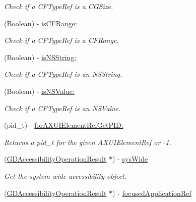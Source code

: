 \begin{DoxyCompactItemize}
\begin{DoxyCompactList}\small\item\em Check if a CFTypeRef is a CGSize. \item\end{DoxyCompactList}\item 
(Boolean) -\/ \hyperlink{interface_g_d_accessibility_manager_ac7682be7c9d421b3b6aff5bd0427c484}{isCFRange:}
\begin{DoxyCompactList}\small\item\em Check if a CFTypeRef is a CFRange. \item\end{DoxyCompactList}\item 
(Boolean) -\/ \hyperlink{interface_g_d_accessibility_manager_a7383e6153121e98d5c0a7b1a01705f50}{isNSString:}
\begin{DoxyCompactList}\small\item\em Check if a CFTypeRef is an NSString. \item\end{DoxyCompactList}\item 
(Boolean) -\/ \hyperlink{interface_g_d_accessibility_manager_acdce820e06d533b51a1eaec8618019c1}{isNSValue:}
\begin{DoxyCompactList}\small\item\em Check if a CFTypeRef is an NSValue. \item\end{DoxyCompactList}\item 
(pid\_\-t) -\/ \hyperlink{interface_g_d_accessibility_manager_a77c4e5a6c3c879ba3a1a4d305c2ebd31}{forAXUIElementRefGetPID:}
\begin{DoxyCompactList}\small\item\em Returns a pid\_\-t for the given AXUIElementRef or -\/1. \item\end{DoxyCompactList}\item 
\hypertarget{interface_g_d_accessibility_manager_a401462c73c47443c17a5f9d7ca23dd6e}{
(\hyperlink{interface_g_d_accessibility_operation_result}{GDAccessibilityOperationResult} $\ast$) -\/ \hyperlink{interface_g_d_accessibility_manager_a401462c73c47443c17a5f9d7ca23dd6e}{sysWide}}
\label{interface_g_d_accessibility_manager_a401462c73c47443c17a5f9d7ca23dd6e}

\begin{DoxyCompactList}\small\item\em Get the system wide accessibility object. \item\end{DoxyCompactList}\item 
\hypertarget{interface_g_d_accessibility_manager_a0ab18a6fc517e268a93f5e1b3157fd2a}{
(\hyperlink{interface_g_d_accessibility_operation_result}{GDAccessibilityOperationResult} $\ast$) -\/ \hyperlink{interface_g_d_accessibility_manager_a0ab18a6fc517e268a93f5e1b3157fd2a}{focusedApplicationRef}}
\label{interface_g_d_accessibility_manager_a0ab18a6fc517e268a93f5e1b3157fd2a}


\end{DoxyCompactItemize}
